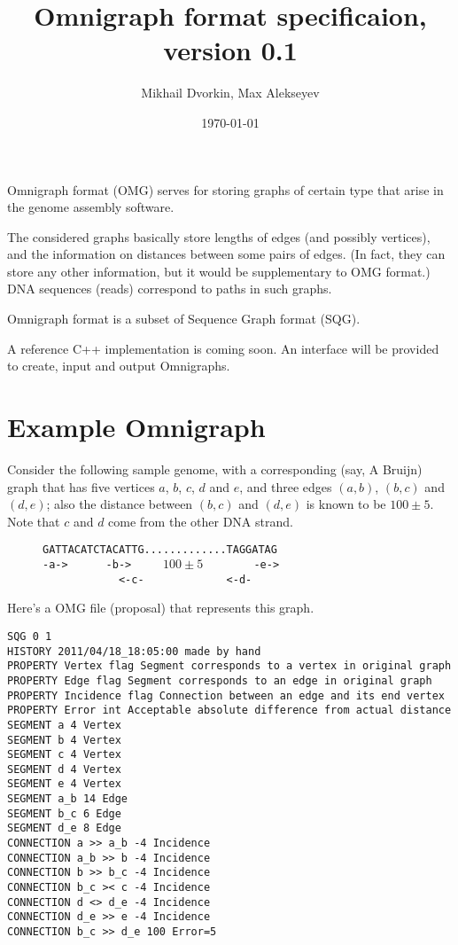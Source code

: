 \documentclass[12pt]{article}
\begin{document}
\author{Mikhail Dvorkin, Max Alekseyev}
\title{Omnigraph format specificaion, version 0.1}
\date{\today}
\maketitle

Omnigraph format (OMG) serves for storing graphs of certain type
that arise in the genome assembly software.

The considered graphs basically store lengths
of edges (and possibly vertices),
and the information on distances between some pairs of edges.
(In fact, they can store any other information, but it would
be supplementary to OMG format.)
DNA sequences (reads) correspond to paths in such graphs.

Omnigraph format is a subset of Sequence Graph format (SQG).

A reference C++ implementation is coming soon.
An interface will be provided to create, input and output
Omnigraphs.

\section{Example Omnigraph}

Consider the following sample genome, with a corresponding
(say, A Bruijn) graph
that has five vertices $a$, $b$, $c$, $d$ and $e$, and three edges
$(a, b)$, $(b, c)$ and $(d, e)$; also the distance between
$(b, c)$ and $(d, e)$ is known to be $100 \pm 5$.
Note that $c$ and $d$ come from the other DNA strand.

\begin{figure}[h]
\verb"GATTACATCTACATTG.............TAGGATAG"\\
\verb"-a->      -b->     "$100 \pm 5$\verb"        -e->    "\\
\verb"            <-c-             <-d-    "
\end{figure}

Here's a OMG file (proposal) that represents this graph.

\begin{verbatim}
SQG 0 1
HISTORY 2011/04/18_18:05:00 made by hand
PROPERTY Vertex flag Segment corresponds to a vertex in original graph
PROPERTY Edge flag Segment corresponds to an edge in original graph
PROPERTY Incidence flag Connection between an edge and its end vertex
PROPERTY Error int Acceptable absolute difference from actual distance
SEGMENT a 4 Vertex
SEGMENT b 4 Vertex
SEGMENT c 4 Vertex
SEGMENT d 4 Vertex
SEGMENT e 4 Vertex
SEGMENT a_b 14 Edge
SEGMENT b_c 6 Edge
SEGMENT d_e 8 Edge
CONNECTION a >> a_b -4 Incidence
CONNECTION a_b >> b -4 Incidence
CONNECTION b >> b_c -4 Incidence
CONNECTION b_c >< c -4 Incidence
CONNECTION d <> d_e -4 Incidence
CONNECTION d_e >> e -4 Incidence
CONNECTION b_c >> d_e 100 Error=5
\end{verbatim}
\end{document}
